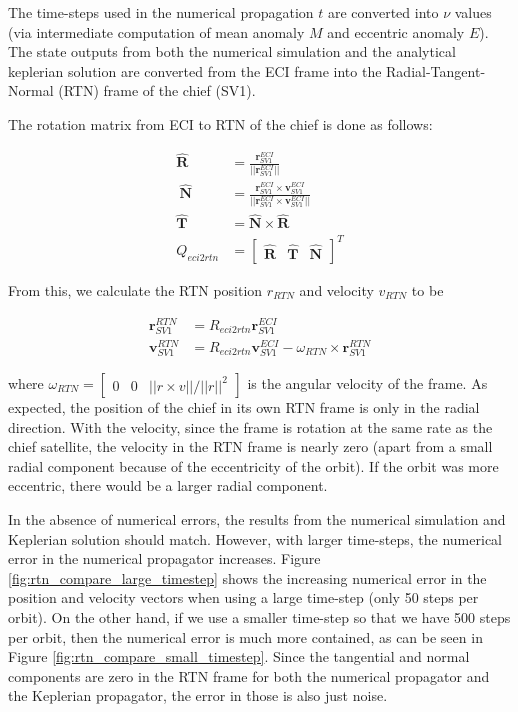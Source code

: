 The time-steps used in the numerical propagation $t$ are converted into $\nu$ values (via intermediate computation of mean anomaly $M$ and eccentric anomaly $E$). The state outputs from both the numerical simulation and the analytical keplerian solution are converted from the ECI frame into the Radial-Tangent-Normal (RTN) frame of the chief (SV1).

The rotation matrix from ECI to RTN of the chief is done as follows:

\begin{align}
    \boldsymbol{\hat{R}} &= \frac{\boldsymbol{r}^{ECI}_{SV1}}{||\boldsymbol{r}^{ECI}_{SV1}||} \\ \
    \boldsymbol{\hat{N}} &= \frac{\boldsymbol{r}^{ECI}_{SV1} \times \boldsymbol{v}^{ECI}_{SV1}}{||\boldsymbol{r}^{ECI}_{SV1} \times \boldsymbol{v}^{ECI}_{SV1}||} \\
    \boldsymbol{\hat{T}} &= \boldsymbol{\hat{N}} \times \boldsymbol{\hat{R}} \\
    Q_{eci2rtn} &= \begin{bmatrix}
        \boldsymbol{\hat{R}} & \boldsymbol{\hat{T}} & \boldsymbol{\hat{N}}
    \end{bmatrix}^T \label{eq:eci2rtn}
\end{align}

From this, we calculate the RTN position $r_{RTN}$ and velocity $v_{RTN}$ to be

\begin{align}
    \boldsymbol{r}^{RTN}_{SV1} &= R_{eci2rtn} \boldsymbol{r}^{ECI}_{SV1} \\
    \boldsymbol{v}^{RTN}_{SV1} &= R_{eci2rtn} \boldsymbol{v}^{ECI}_{SV1} - \omega_{RTN} \times \boldsymbol{r}^{RTN}_{SV1} \label{eq:v_rtn}
\end{align}

where $\omega_{RTN} = \begin{bmatrix}
    0 & 0 & ||r\times v ||/||r||^2
\end{bmatrix}$ is the angular velocity of the frame. As expected, the position of the chief in its own RTN frame is only in the radial direction. With the velocity, since the frame is rotation at the same rate as the chief satellite, the velocity in the RTN frame is nearly zero (apart from a small radial component because of the eccentricity of the orbit). If the orbit was more eccentric, there would be a larger radial component.

In the absence of numerical errors, the results from the numerical simulation and Keplerian solution should match. However, with larger time-steps, the numerical error in the numerical propagator increases. Figure \ref{fig:rtn_compare_large_timestep} shows the increasing numerical error in the position and velocity vectors when using a large time-step (only 50 steps per orbit). On the other hand, if we use a smaller time-step so that we have 500 steps per orbit, then the numerical error is much more contained, as can be seen in Figure \ref{fig:rtn_compare_small_timestep}. Since the tangential and normal components are zero in the RTN frame for both the numerical propagator and the Keplerian propagator, the error in those is also just noise.

